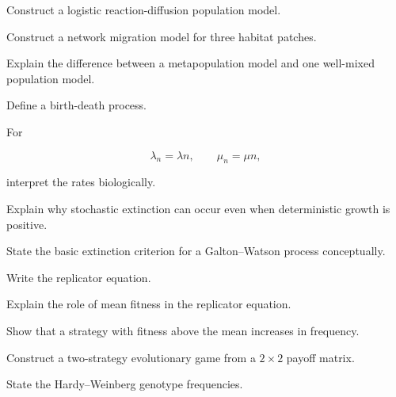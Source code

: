 \begin{exercise}[3]
Construct a logistic reaction-diffusion population model.
\end{exercise}

\begin{exercise}[3]
Construct a network migration model for three habitat patches.
\end{exercise}

\begin{exercise}[3]
Explain the difference between a metapopulation model and one well-mixed
population model.
\end{exercise}

\begin{exercise}[2]
Define a birth-death process.
\end{exercise}

\begin{exercise}[3]
For

\[
\lambda_n=\lambda n,
\qquad
\mu_n=\mu n,
\]

interpret the rates biologically.
\end{exercise}

\begin{exercise}[3]
Explain why stochastic extinction can occur even when deterministic growth
is positive.
\end{exercise}

\begin{exercise}[3]
State the basic extinction criterion for a Galton--Watson process
conceptually.
\end{exercise}

\begin{exercise}[2]
Write the replicator equation.
\end{exercise}

\begin{exercise}[3]
Explain the role of mean fitness in the replicator equation.
\end{exercise}

\begin{exercise}[3]
Show that a strategy with fitness above the mean increases in frequency.
\end{exercise}

\begin{exercise}[3]
Construct a two-strategy evolutionary game from a \(2\times2\) payoff
matrix.
\end{exercise}

\begin{exercise}[2]
State the Hardy--Weinberg genotype frequencies.
\end{exercise}


